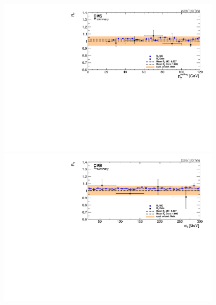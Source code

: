 \begin{figure}[htbp]
\begin{minipage}[t]{0.3\textwidth}
    \includegraphics[width=\textwidth]{bkgd/figs/Triggereff_SFvsOF_Syst_PFHT_HighHTExclusiveCentral_Run2015_25ns_TrailingPt_None_NonIso_MC.pdf}
  \end{minipage}
  \begin{minipage}[t]{0.3\textwidth}
    \includegraphics[width=\textwidth]{bkgd/figs/Triggereff_SFvsOF_Syst_PFHT_HighHTExclusiveCentral_Run2015_25ns_Mll_None_NonIso_MC.pdf}
  \end{minipage}
  \begin{minipage}[t]{0.3\textwidth}

\end{minipage}
\end{figure}
